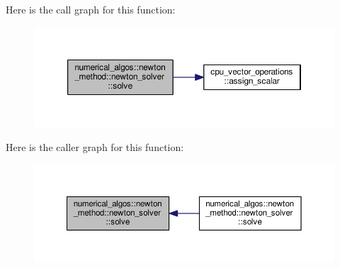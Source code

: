 Here is the call graph for this function\-:
\nopagebreak
\begin{figure}[H]
\begin{center}
\leavevmode
\includegraphics[width=350pt]{classnumerical__algos_1_1newton__method_1_1newton__solver_ac7b04b8ab16d9ee3e001c8c6c81cf55c_cgraph}
\end{center}
\end{figure}




Here is the caller graph for this function\-:
\nopagebreak
\begin{figure}[H]
\begin{center}
\leavevmode
\includegraphics[width=350pt]{classnumerical__algos_1_1newton__method_1_1newton__solver_ac7b04b8ab16d9ee3e001c8c6c81cf55c_icgraph}
\end{center}
\end{figure}


